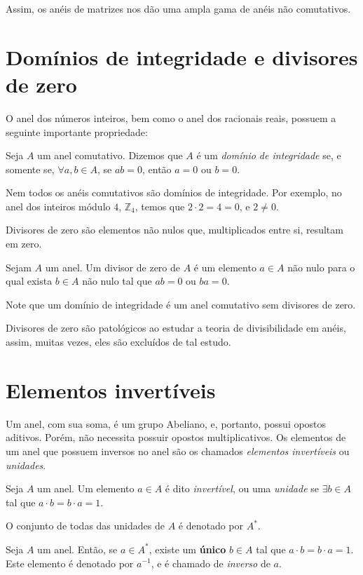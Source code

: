Assim, os anéis de matrizes nos dão uma ampla gama de anéis não comutativos.
\section{Domínios de integridade e divisores de zero}
O anel dos números inteiros, bem como o anel dos racionais reais, possuem a seguinte importante propriedade:
\begin{definition}
Seja $A$ um anel comutativo. Dizemos que $A$ é um \emph{domínio de integridade} se, e somente se, $\forall a, b \in A$, se $ab=0$, então $a=0$ ou $b=0$.
\end{definition}

Nem todos os anéis comutativos são domínios de integridade. Por exemplo, no anel dos inteiros módulo $4$, $\mathbb Z_4$, temos que $2\cdot 2=4=0$, e $2\neq 0$.

Divisores de zero são elementos não nulos que, multiplicados entre si, resultam em zero.

\begin{definition}
Sejam $A$ um anel. Um divisor de zero de $A$ é um elemento $a \in A$ não nulo para o qual exista $b \in A$ não nulo tal que $ab=0$ ou $ba=0$.
\end{definition}

Note que um domínio de integridade é um anel comutativo sem divisores de zero.

Divisores de zero são patológicos ao estudar a teoria de divisibilidade em anéis, assim, muitas vezes, eles são excluídos de tal estudo.

\section{Elementos invertíveis}
Um anel, com sua soma, é um grupo Abeliano, e, portanto, possui opostos aditivos. Porém, não necessita possuir opostos multiplicativos. Os elementos de um anel que possuem inversos no anel são os chamados \emph{elementos invertíveis} ou \emph{unidades}.
\begin{definition}
    Seja $A$ um anel.
    Um elemento $a \in A$ é dito \emph{invertível}, ou uma \emph{unidade} se $\exists b \in A$ tal que $a \cdot b = b \cdot a = 1$.
    
    O conjunto de todas das unidades de $A$ é denotado por $A^*$.
\end{definition}

\begin{definition}
    Seja $A$ um anel.
    Então, se $a \in A^*$, existe um \textbf{único} $b \in A$ tal que $a \cdot b = b \cdot a = 1$. Este elemento é denotado por $a^{-1}$, e é chamado de \emph{inverso} de $a$.
\end{definition}

